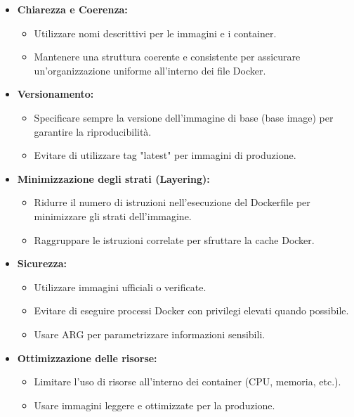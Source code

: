 \documentclass{article}
\begin{document}
\begin{itemize}
    \item \textbf{Chiarezza e Coerenza:}
    \begin{itemize}
        \item Utilizzare nomi descrittivi per le immagini e i container.
        \item Mantenere una struttura coerente e consistente per assicurare un'organizzazione uniforme all'interno dei file Docker.
    \end{itemize}

\item \textbf{Versionamento:}
    \begin{itemize}
        \item Specificare sempre la versione dell'immagine di base (base image) per garantire la riproducibilità.
        \item Evitare di utilizzare tag "latest" per immagini di produzione.
    \end{itemize}

\item \textbf{Minimizzazione degli strati (Layering):}
    \begin{itemize}
        \item Ridurre il numero di istruzioni nell'esecuzione del Dockerfile per minimizzare gli strati dell'immagine.
        \item Raggruppare le istruzioni correlate per sfruttare la cache Docker.
    \end{itemize}

\item \textbf{Sicurezza:}
    \begin{itemize}
        \item Utilizzare immagini ufficiali o verificate.
        \item Evitare di eseguire processi Docker con privilegi elevati quando possibile.
        \item Usare ARG per parametrizzare informazioni sensibili.
    \end{itemize}

\item \textbf{Ottimizzazione delle risorse:}
    \begin{itemize}
        \item Limitare l'uso di risorse all'interno dei container (CPU, memoria, etc.).
        \item Usare immagini leggere e ottimizzate per la produzione.
    \end{itemize}


\end{itemize}
\end{document}
